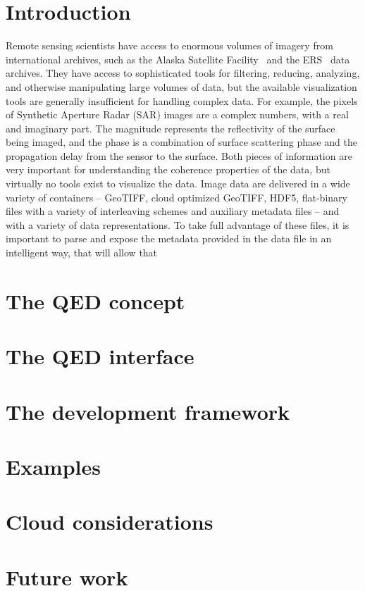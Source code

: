 \documentclass{article}
\begin{document}
\section{Introduction}
\label{sec:intro}
Remote sensing scientists have access to enormous volumes of imagery from international
archives, such as the Alaska Satellite Facility~\cite{ASF} and the ERS~\cite{ERS} data
archives. They have access to sophisticated tools for filtering, reducing, analyzing, and
otherwise manipulating large volumes of data, but the available visualization tools are
generally insufficient for handling complex data. For example, the pixels of Synthetic
Aperture Radar (SAR) images are a complex numbers, with a real and imaginary part. The
magnitude represents the reflectivity of the surface being imaged, and the phase is a
combination of surface scattering phase and the propagation delay from the sensor to the
surface. Both pieces of information are very important for understanding the coherence
properties of the data, but virtually no tools exist to visualize the data. Image data are
delivered in a wide variety of containers -- GeoTIFF, cloud optimized GeoTIFF, HDF5,
flat-binary files with a variety of interleaving schemes and auxiliary metadata files --
and with a variety of data representations. To take full advantage of these files, it is
important to parse and expose the metadata provided in the data file in an intelligent
way, that will allow that

\section{The QED concept}
\label{sec:concept}

\section{The QED interface}
\label{sec:interface}

\section{The development framework}
\label{sec:framework}

\section{Examples}
\label{sec:examples}

\section{Cloud considerations}
\label{sec:cloud}

\section{Future work}
\label{sec:future}



\end{document}
